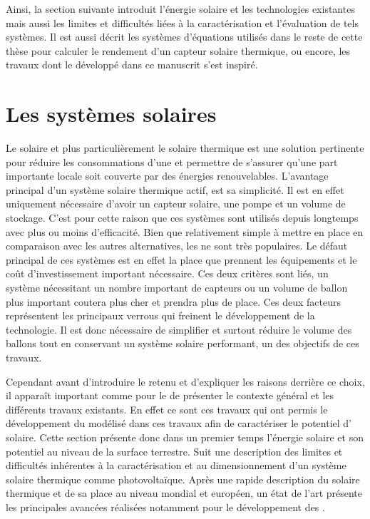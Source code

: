 Ainsi, la section suivante introduit l’énergie solaire et les technologies existantes mais
aussi les limites et difficultés liées à la caractérisation et l’évaluation
de tels systèmes. Il est aussi décrit les systèmes d’équations utilisés dans le reste de
cette thèse pour calculer le rendement d’un capteur solaire thermique, ou encore, les
travaux dont le  développé dans ce manuscrit s’est inspiré.





\section{Les systèmes solaires} %
\label{sec:les_systemes_solaires}
Le solaire et plus particulièrement le solaire thermique est
une solution pertinente pour réduire les consommations d’une  et permettre
de s’assurer qu’une part importante locale soit couverte par des énergies renouvelables.
L’avantage principal d’un système solaire thermique actif, est sa simplicité. Il est en
effet uniquement nécessaire d’avoir un capteur solaire, une pompe et un volume de stockage. C’est pour
cette raison que ces systèmes sont utilisés depuis longtemps avec plus ou moins
d’efficacité. Bien que relativement simple à mettre en place en comparaison avec les
autres alternatives, les  ne sont très populaires. Le défaut principal de ces
systèmes est en effet la place que prennent les équipements et le coût d’investissement
important nécessaire. Ces deux critères sont liés, un système nécessitant un nombre
important de capteurs ou un volume de ballon plus important coutera plus cher et prendra
plus de place. Ces deux facteurs représentent les principaux verrous qui freinent le
développement de la technologie. Il est donc nécessaire de simplifier et surtout réduire
le volume des ballons tout en conservant un système solaire performant, un des objectifs
de ces travaux.

Cependant avant d’introduire le  retenu et d’expliquer les raisons derrière ce
choix, il apparaît important comme pour le  de présenter le contexte général et
les différents travaux existants. En effet ce sont ces travaux qui ont permis le
développement du  modélisé dans ces travaux afin de caractériser le potentiel
d’ solaire. Cette section présente donc dans un premier
temps l’énergie solaire et son potentiel au niveau de la surface terrestre. Suit une
description des limites et difficultés inhérentes à la caractérisation et au
dimensionnement d’un système solaire thermique comme photovoltaïque. Après une rapide
description du solaire thermique et de sa place au niveau mondial et européen, un état
de l’art présente les principales avancées réalisées notamment pour le développement des .


